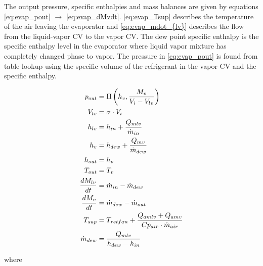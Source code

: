 \medskip
The output pressure, specific enthalpies and mass balances are given by equations \cref{eq:evap_pout} $\rightarrow$ \cref{eq:evap_dMvdt}. \cref{eq:evap_Tsup} describes the temperature of the air leaving the evaporator and \cref{eq:evap_mdot_{lv}} describes the flow from the liquid-vapor CV to the vapor CV. The dew point specific enthalpy is the specific enthalpy level in the evaporator where liquid vapor mixture has completely changed phase to vapor. The pressure in \cref{eq:evap_pout} is found from table lookup using the specific volume of the refrigerant in the vapor CV and the specific enthalpy.

\begin{align}
	p_{out}            & = \Pi \left( h_v, \frac{M_v}{V_i-V_{lv}} \right)		\label{eq:evap_pout}                       \\
	V_{lv}             & = \sigma \cdot V_i                                                                           \\
	h_{lv}             & = h_{in} + \frac{Q_{mlv}}{\dot{m}_{in}}                                                      \\
	h_v                & = h_{dew} + \frac{Q_{mv}}{\dot{m}_{dew}}               \label{eq:evap_hv}                                       \\
	h_{out}            & = h_v                                                                                       \\
	T_{out}            & = T_v                                                                                        \\
	\frac{dM_{lv}}{dt} & = \dot{m}_{in} - \dot{m}_{dew}                                                               \\
	\frac{dM_v}{dt}    & = \dot{m}_{dew} - \dot{m}_{out}                   \label{eq:evap_dMvdt}                      \\
	T_{sup}            & = T_{retfan} +  \frac{Q_{amlv} + Q_{amv}}{Cp_{air} \cdot \dot{m}_{air}} \label{eq:evap_Tsup} \\
	\dot{m}_{dew}      & = \frac{Q_{mlv}}{h_{dew} - h_{in}} \label{eq:evap_mdot_{lv}}
\end{align}



where\\


